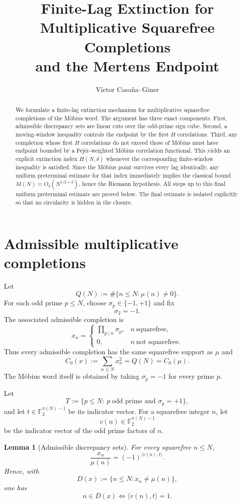 \documentclass[11pt]{article}
\title{Finite-Lag Extinction for Multiplicative Squarefree Completions\\and the Mertens Endpoint}
\author{V\'ictor Casa\~na--Giner}
\date{}
\newtheorem{lemma}[theorem]{Lemma}
\theoremstyle{definition}
\theoremstyle{remark}
\newcommand{\Ftwo}{\mathbb F_2}
\begin{document}
\maketitle

\begin{abstract}
We formulate a finite-lag extinction mechanism for multiplicative squarefree completions of the M\"obius word.  The argument has three exact components.  First, admissible discrepancy sets are linear cuts over the odd-prime sign cube.  Second, a moving-window inequality controls the endpoint by the first $H$ correlations.  Third, any completion whose first $H$ correlations do not exceed those of M\"obius must have endpoint bounded by a Fej\'er-weighted M\"obius correlation functional.  This yields an explicit extinction index $H(N,\delta)$ whenever the corresponding finite-window inequality is satisfied.  Since the M\"obius point survives every lag identically, any uniform preterminal estimate for that index immediately implies the classical bound $M(N)=O_\delta(N^{1/2+\delta})$, hence the Riemann hypothesis.  All steps up to this final uniform preterminal estimate are proved below.  The final estimate is isolated explicitly so that no circularity is hidden in the closure.
\end{abstract}

\section{Admissible multiplicative completions}

Let
\[
Q(N):=\#\{n\le N:\mu(n)\neq 0\}.
\]
For each odd prime $p\le N$, choose $\sigma_p\in\{-1,+1\}$ and fix
\[
\sigma_2=-1.
\]
The associated admissible completion is
\[
x_n=
\begin{cases}
\displaystyle\prod_{p\mid n}\sigma_p,& n\ \text{squarefree},\\[1ex]
0,& n\ \text{not squarefree}.
\end{cases}
\]
Thus every admissible completion has the same squarefree support as $\mu$ and
\[
C_0(x):=\sum_{n\le N}x_n^2=Q(N)=C_0(\mu).
\]
The M\"obius word itself is obtained by taking $\sigma_p=-1$ for every prime $p$.

Let
\[
T:=\{p\le N:\ p\ \text{odd prime and }\sigma_p=+1\},
\]
and let $t\in\Ftwo^{\pi(N)-1}$ be its indicator vector.  For a squarefree integer $n$, let
\[
v(n)\in\Ftwo^{\pi(N)-1}
\]
be the indicator vector of the odd prime factors of $n$.

\begin{lemma}[Admissible discrepancy sets]
For every squarefree $n\le N$,
\[
\frac{x_n}{\mu(n)}=(-1)^{\langle v(n),t\rangle}.
\]
Hence, with
\[
D(x):=\{n\le N:x_n\neq\mu(n)\},
\]
one has
\[
\boxed{\quad n\in D(x)\iff \langle v(n),t\rangle=1.\quad}
\]
\end{lemma}
\end{document}
